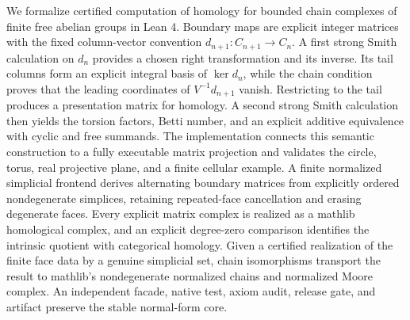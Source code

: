 We formalize certified computation of homology for bounded chain complexes of
finite free abelian groups in Lean 4.  Boundary maps are explicit integer
matrices with the fixed column-vector convention
$d_{n+1}\colon C_{n+1}\to C_n$.  A first strong Smith calculation on $d_n$
provides a chosen right transformation and its inverse.  Its tail columns
form an explicit integral basis of $\ker d_n$, while the chain condition
proves that the leading coordinates of $V^{-1}d_{n+1}$ vanish.  Restricting
to the tail produces a presentation matrix for homology.  A second strong
Smith calculation then yields the torsion factors, Betti number, and an
explicit additive equivalence with cyclic and free summands.  The
implementation connects this semantic construction to a fully executable
matrix projection and validates the circle, torus, real projective plane,
and a finite cellular example.  A finite normalized simplicial frontend
derives alternating boundary matrices from explicitly ordered nondegenerate
simplices, retaining repeated-face cancellation and erasing degenerate faces.
Every explicit matrix complex is realized as a mathlib homological complex,
and an explicit degree-zero comparison identifies the intrinsic quotient
with categorical homology.  Given a certified realization of the finite face
data by a genuine simplicial set, chain isomorphisms transport the result to
mathlib's nondegenerate normalized chains and normalized Moore complex.
An independent facade, native test, axiom audit, release gate, and artifact
preserve the stable normal-form core.
